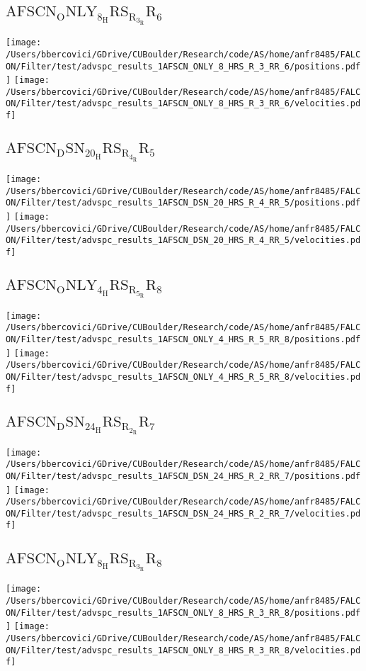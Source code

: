 \subsection{$\mathrm{AFSCN_ONLY_8_HRS_R_3_RR_6}$}
\texttt{[image: /Users/bbercovici/GDrive/CUBoulder/Research/code/AS/home/anfr8485/FALCON/Filter/test/advspc\_results\_1AFSCN\_ONLY\_8\_HRS\_R\_3\_RR\_6/positions.pdf]}
\texttt{[image: /Users/bbercovici/GDrive/CUBoulder/Research/code/AS/home/anfr8485/FALCON/Filter/test/advspc\_results\_1AFSCN\_ONLY\_8\_HRS\_R\_3\_RR\_6/velocities.pdf]}
\subsection{$\mathrm{AFSCN_DSN_20_HRS_R_4_RR_5}$}
\texttt{[image: /Users/bbercovici/GDrive/CUBoulder/Research/code/AS/home/anfr8485/FALCON/Filter/test/advspc\_results\_1AFSCN\_DSN\_20\_HRS\_R\_4\_RR\_5/positions.pdf]}
\texttt{[image: /Users/bbercovici/GDrive/CUBoulder/Research/code/AS/home/anfr8485/FALCON/Filter/test/advspc\_results\_1AFSCN\_DSN\_20\_HRS\_R\_4\_RR\_5/velocities.pdf]}
\subsection{$\mathrm{AFSCN_ONLY_4_HRS_R_5_RR_8}$}
\texttt{[image: /Users/bbercovici/GDrive/CUBoulder/Research/code/AS/home/anfr8485/FALCON/Filter/test/advspc\_results\_1AFSCN\_ONLY\_4\_HRS\_R\_5\_RR\_8/positions.pdf]}
\texttt{[image: /Users/bbercovici/GDrive/CUBoulder/Research/code/AS/home/anfr8485/FALCON/Filter/test/advspc\_results\_1AFSCN\_ONLY\_4\_HRS\_R\_5\_RR\_8/velocities.pdf]}
\subsection{$\mathrm{AFSCN_DSN_24_HRS_R_2_RR_7}$}
\texttt{[image: /Users/bbercovici/GDrive/CUBoulder/Research/code/AS/home/anfr8485/FALCON/Filter/test/advspc\_results\_1AFSCN\_DSN\_24\_HRS\_R\_2\_RR\_7/positions.pdf]}
\texttt{[image: /Users/bbercovici/GDrive/CUBoulder/Research/code/AS/home/anfr8485/FALCON/Filter/test/advspc\_results\_1AFSCN\_DSN\_24\_HRS\_R\_2\_RR\_7/velocities.pdf]}
\subsection{$\mathrm{AFSCN_ONLY_8_HRS_R_3_RR_8}$}
\texttt{[image: /Users/bbercovici/GDrive/CUBoulder/Research/code/AS/home/anfr8485/FALCON/Filter/test/advspc\_results\_1AFSCN\_ONLY\_8\_HRS\_R\_3\_RR\_8/positions.pdf]}
\texttt{[image: /Users/bbercovici/GDrive/CUBoulder/Research/code/AS/home/anfr8485/FALCON/Filter/test/advspc\_results\_1AFSCN\_ONLY\_8\_HRS\_R\_3\_RR\_8/velocities.pdf]}
